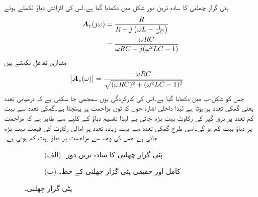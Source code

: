 پٹی گزار چھلنی کا سادہ ترین دور شکل  میں دکھایا گیا ہے۔اس کی افزائش دباؤ لکھتے ہوئے
\begin{gather}
\begin{aligned}\label{مساوات_تعددی_پٹی_گزار_دور_مساوات}
{\ensuremath{{\boldsymbol{A}}}}_v(j\omega)&=\frac{R}{R+j\left(\omega L-\frac{1}{\omega C}\right)}\\
&=\frac{\omega RC}{\omega RC +j(\omega^2 LC-1)}
\end{aligned}
\end{gather}
مقداری تفاعل لکھتے ہیں
\begin{align}\label{مساوات_تعددی_پٹی_گزار_دور_حتمی}
\abs{{{\boldsymbol{A}}}_v(\omega)}&=\frac{\omega RC}{\sqrt{(\omega RC)^2+(\omega^2 LC-1)^2}}
\end{align}
جس کو شکل-ب میں دکھایا گیا ہے۔اس کی کارکردگی یوں سمجھی جا سکتی ہے کہ درمیانی تعدد یعنی گمکی تعدد  پر  ہوتا ہے لہٰذا داخلی اشارہ جوں کا توں مزاحمت پر پہنچتا ہے۔گمکی تعدد سے بہت کم تعدد پر برق گیر کی رکاوٹ بہت بڑھ جاتی ہے  لہٰذا تقسیم دباؤ کے کلیے سے ظاہر ہے کہ مزاحمت پر دباؤ بہت کم ہو گی۔اسی طرح گمکی تعدد سے بہت زیادہ تعدد پر امالی رکاوٹ کی قیمت بہت بڑھ جاتی ہے جس کی وجہ سے مزاحمت پر دباؤ بہت کم ہوتی ہے۔
%
\begin{figure}
\centering
\begin{subfigure}{0.33\textwidth}
\centering
{}
\caption*{(الف) پٹی گزار چھلنی کا سادہ ترین دور۔}
\end{subfigure}%
\begin{subfigure}{0.66\textwidth}
\centering
{}
\caption*{(ب) کامل اور حقیقی پٹی گزار چھلنی کے خط۔}
\end{subfigure}
\caption{پٹی گزار چھلنی۔}
\label{شکل_تعدد_کامل_پٹی_گزار_خصلت}
\end{figure}


